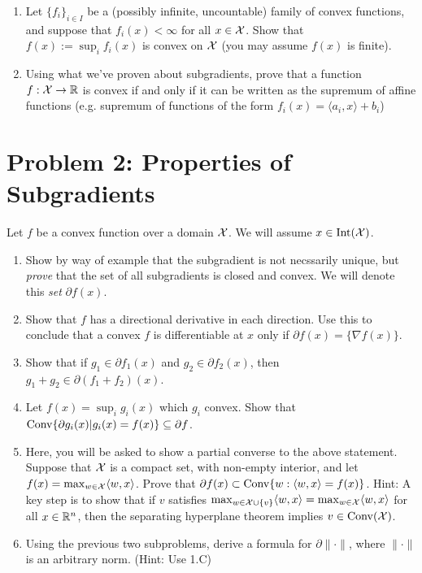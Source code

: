 \documentclass[12pt]{article}
\begin{document}
\begin{enumerate}
\item
Let $\{f_{i}\}_{i \in I}$ be a (possibly infinite, uncountable) family of convex functions, and suppose that $f_{i}(x) < \infty$ for all $x \in {\cal X}$. Show that $f(x) := \sup_{i} f_{i}(x)$ is convex on ${\cal X}$ (you may assume $f(x)$ is finite).

\item
Using what we've proven about subgradients, prove that a function $f: {\cal X} \to \mathbb{R}$ is convex if and only if it can be written as the supremum of affine functions (e.g. supremum of functions of the form $f_i(x) = \langle a_{i}, x \rangle + b_{i}$)
\end{enumerate}

\section*{Problem 2: Properties of Subgradients}
Let $f$ be a convex function over a domain ${\cal X}$. We will assume $x \in \mathrm{Int}({\cal X})$. 
\begin{enumerate}
\item
Show by way of example that the subgradient is not necssarily unique, but \emph{prove} that the set of all subgradients is closed and convex. We will denote this \emph{set} $\partial f(x)$.
\item Show that $f$ has a directional derivative in each direction. Use this to conclude that a convex $f$ is differentiable at $x$ only if $\partial f(x) = \{\nabla f(x)\}$.
\item
Show that if $g_1 \in \partial f_1(x)$ and $g_2 \in \partial f_2(x)$, then $g_1 + g_2 \in \partial(f_1 + f_2)(x)$. 
\item
Let $f(x) = \sup_{i} g_{i}(x)$ which $g_{i}$ convex. Show that $\mathrm{Conv} \{\partial g_{i}(x) |  g_{i}(x) =f(x) \} \subseteq \partial f$. 
\item Here, you will be asked to show a partial converse to the above statement. Suppose that ${\cal X}$ is a compact set, with non-empty interior, and let $f(x) = \max_{w \in {\cal X}} \langle w, x \rangle$. Prove that $\partial f(x) \subset \mathrm{Conv} \{w: \langle w, x \rangle = f(x)\}$. Hint: A key step is to show that if $v$ satisfies $\max_{w \in {\cal X} \cup \{v\}} \langle w, x \rangle = \max_{w \in {\cal X}} \langle w, x \rangle$ for all $x \in \mathbb{R}^n$, then the separating hyperplane theorem implies $v \in \mathrm{Conv}({\cal X})$.
\item Using the previous two subproblems, derive a formula for $\partial \|\cdot\|$, where $\|\cdot\|$ is an arbitrary norm. (Hint: Use 1.C)
\end{enumerate}
\end{document}
